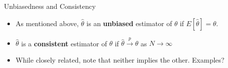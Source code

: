 












\begin{frame}{Unbiasedness and Consistency}
\begin{itemize}
	\item As mentioned above,
	 $\hat{\theta}$ is an {\bf unbiased} estimator of $\theta$ if $E\left[\hat{\theta}\right] = \theta$.
	 
	 \medskip
	 \item  $\hat{\theta}$ is a {\bf consistent} estimator of $\theta$ if $\hat{\theta}\overset{p}{\rightarrow}\theta$
	 as $N\rightarrow \infty$
	
	\medskip
	\item While closely related, note that neither implies the other. Examples?
\end{itemize}
\end{frame}


